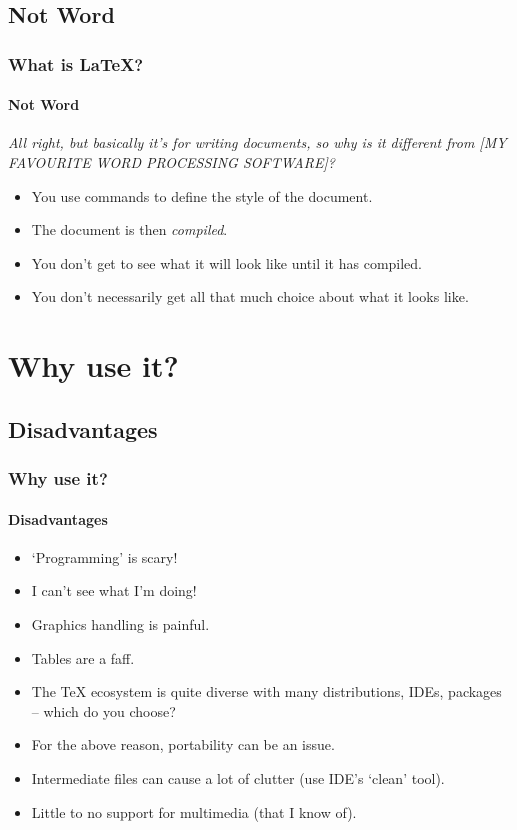 \documentclass{beamer}
\begin{document}
\subsection{Not Word}
\begin{frame}
\frametitle{What is \LaTeX?}
\framesubtitle{Not Word}
\emph{All right, but basically it's for writing documents, so why is it different from [MY FAVOURITE WORD PROCESSING SOFTWARE]?}
\vspace{\baselineskip}
\begin{itemize}
\item You use commands to define the style of the document.
\item The document is then \emph{compiled}.
\item You don't get to see what it will look like until it has compiled.
\item You don't necessarily get all that much choice about what it looks like.
\end{itemize}
\end{frame}

\section{Why use it?}

\subsection[Cons]{Disadvantages}
\begin{frame}
\frametitle{Why use it?}
\framesubtitle{Disadvantages}

\begin{itemize}
\item `Programming' is scary!
\item I can't see what I'm doing!
\item Graphics handling is painful.
\item Tables are a faff.
\item The TeX ecosystem is quite diverse with many distributions, IDEs, packages -- which do you choose?
\item For the above reason, portability can be an issue.
\item Intermediate files can cause a lot of clutter (use IDE's `clean' tool).
\item Little to no support for multimedia (that I know of).
\end{itemize}
\end{frame}
\end{document}
